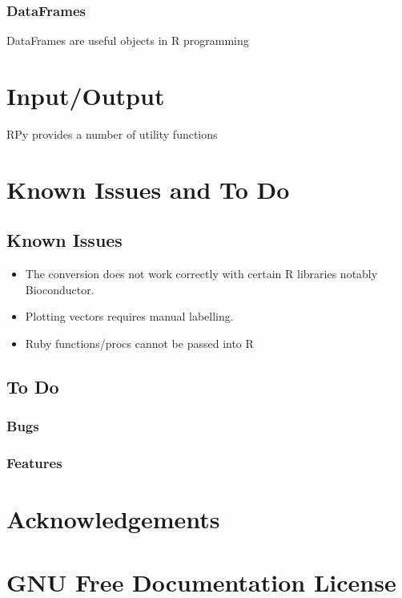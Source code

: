\documentclass[a4paper,12pt]{book}
\begin{document}
\subsection{DataFrames}

DataFrames are useful objects in R programming

\chapter{Input/Output}

RPy provides a number of utility functions

\chapter{Known Issues and To Do}

\section{Known Issues}

\begin{itemize}
\item The conversion does not work correctly with certain R libraries notably Bioconductor.
\item Plotting vectors requires manual labelling.
\item Ruby functions/procs cannot be passed into R
\end{itemize}

\section{To Do}

\subsection{Bugs}
\subsection{Features}

\chapter{Acknowledgements}

\chapter{GNU Free Documentation License}
\end{document}
